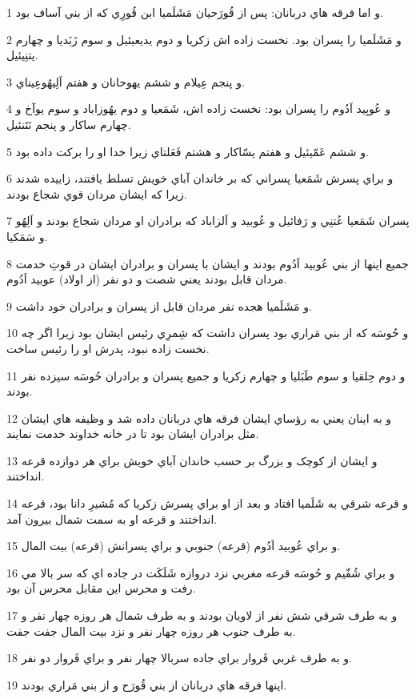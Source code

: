 \par 1 و اما فرقه هاي دربانان: پس از قُورَحيان مَشَلَميا ابن قُورِي که از بني آساف بود.
\par 2 و مَشَلَميا را پسران بود. نخست زاده اش زکريا و دوم يديعيئيل و سوم زَبَديا و چهارم يتنِيئيل.
\par 3 و پنجم عِيلام و ششم يهوحانان و هفتم اَلِيهُوعِيناي.
\par 4 و عُوبِيد اَدُوم را پسران بود: نخست زاده اش، شَمَعيا و دوم يهُوزاباد و سوم يوآخ و چهارم ساکار و پنجم نَتَنئيل.
\par 5 و ششم عَمّيئيل و هفتم يسّاکار و هشتم فَعَلتاي زيرا خدا او را برکت داده بود.
\par 6 و براي پسرش شَمَعيا پسراني که بر خاندان آباي خويش تسلط يافتند، زاييده شدند زيرا که ايشان مردان قوي شجاع بودند.
\par 7 پسران شَمَعيا عُتنِي و رَفائيل و عُوبيد و اَلزاباد که برادران او مردان شجاع بودند و اَلِهُو و سَمَکيا.
\par 8 جميع اينها از بني عُوبيد اَدُوم بودند و ايشان با پسران و برادران ايشان در قوتِ خدمت مردان قابل بودند يعني شصت و دو نفر (از اولاد) عوبيد اَدُوم.
\par 9 و مَشَلَميا هجده نفر مردان قابل از پسران و برادران خود داشت.
\par 10 و حُوسَه که از بني مَراري بود پسران داشت که شِمرِي رئيس ايشان بود زيرا اگر چه نخست زاده نبود، پدرش او را رئيس ساخت.
\par 11 و دوم حِلقيا و سوم طَبَليا و چهارم زکريا و جميع پسران و برادران حُوسَه سيزده نفر بودند.
\par 12 و به اينان يعني به رؤساي ايشان فرقه هاي دربانان داده شد و وظيفه هاي ايشان مثل برادران ايشان بود تا در خانه خداوند خدمت نمايند.
\par 13 و ايشان از کوچک و بزرگ بر حسب خاندان آباي خويش براي هر دوازده قرعه انداختند.
\par 14 و قرعه شرقي به شَلَميا افتاد و بعد از او براي پسرش زکريا که مُشيرِ دانا بود، قرعه انداختند و قرعه او به سمت شمال بيرون آمد.
\par 15 و براي عُوبيد اَدُوم (قرعه) جنوبي و براي پسرانش (قرعه) بيت المال.
\par 16 و براي شُفّيم و حُوسَه قرعه مغربي نزد دروازه شَلَکَت در جاده اي که سر بالا مي رفت و محرس اين مقابل محرس آن بود.
\par 17 و به طرف شرقي شش نفر از لاويان بودند و به طرف شمال هر روزه چهار نفر و به طرف جنوب هر روزه چهار نفر و نزد بيت المال جفت جفت.
\par 18 و به طرف غربي فَروار براي جاده سربالا چهار نفر و براي فَروار دو نفر.
\par 19 اينها فرقه هاي دربانان از بني قُورَح و از بني مَراري بودند.
